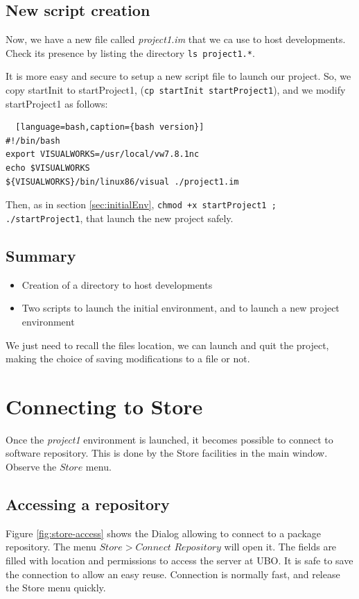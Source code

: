 \documentclass[times]{book}
\begin{document}
\subsection {New script creation }

Now, we have a new file called {\sl project1.im} that we ca use to host developments.
Check its presence by listing the directory {\tt ls project1.*}. 

It is more easy and secure to setup a new script file to launch our project. So, we copy startInit to startProject1,
({\tt cp startInit startProject1}), and we modify startProject1 as follows:

\begin{lstlisting}  [language=bash,caption={bash version}]
#!/bin/bash
export VISUALWORKS=/usr/local/vw7.8.1nc
echo $VISUALWORKS
${VISUALWORKS}/bin/linux86/visual ./project1.im
\end{lstlisting}

Then, as in section \ref{sec:initialEnv}, {\tt chmod +x startProject1 ; ./startProject1}, that launch 
the new project safely.


\subsection{Summary}

\begin{itemize}
\item Creation of a directory to host developments
\item Two scripts to launch the initial environment, and to launch a new project environment
\end{itemize}

We just need to recall the files location, we can launch and quit the project, making the choice of
saving modifications to a file or not.
\section { Connecting to Store}


Once the {\sl project1} environment is launched, it becomes possible to connect to software repository.
This is done by the Store facilities in the main window. Observe the $Store$ menu.

\subsection {Accessing a repository }

Figure  \ref{fig:store-access} shows the Dialog allowing to connect to a package repository.
The menu $Store>Connect$ $Repository$ will open it. The fields are filled with location and permissions to
access the server at UBO. It is safe to save the connection to allow an easy reuse.
Connection is normally fast, and release the Store menu quickly.
\end{document}
